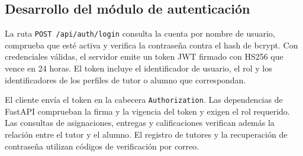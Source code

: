 \subsection{Desarrollo del módulo de autenticación}

La ruta \texttt{POST /api/auth/login} consulta la cuenta por nombre de usuario, comprueba que esté activa y verifica la contraseña contra el hash de bcrypt. Con credenciales válidas, el servidor emite un token JWT firmado con HS256 que vence en 24 horas. El token incluye el identificador de usuario, el rol y los identificadores de los perfiles de tutor o alumno que correspondan.

El cliente envía el token en la cabecera \texttt{Authorization}. Las dependencias de FastAPI comprueban la firma y la vigencia del token y exigen el rol requerido. Las consultas de asignaciones, entregas y calificaciones verifican además la relación entre el tutor y el alumno. El registro de tutores y la recuperación de contraseña utilizan códigos de verificación por correo.
